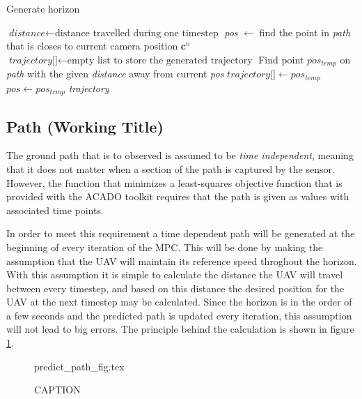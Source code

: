 \begin{algorithm}
\caption{Generate horizon}
\label{alg:genHor}
\begin{algorithmic}
	\State $\textit{distance} \gets \text{distance travelled during one timestep}$
	\State \textit{pos} $\gets$ find the point in \textit{path} that is closes to current camera position $\mathbf{c}^n$
	\State $\textit{trajectory[]} \gets \text{empty list to store the generated trajectory}$
		\State Find point \textit{$pos_{temp}$} on \textit{path} with the given \textit{distance} away from current \textit{pos}
		\State $\textit{trajectory[]} \gets pos_{temp}$
		\State $pos \gets pos_{temp}$
	\EndFor
	\Return \textit{trajectory}
\EndProcedure
\end{algorithmic}
\end{algorithm}


\subsection{Path (Working Title)}

The ground path that is to observed is assumed to be \textit{time independent}, meaning that it does not matter when a section of the path is captured by the sensor. However, the function that minimizes a least-squares objective function that is provided with the ACADO toolkit requires that the path is given as values with associated time points.

In order to meet this requirement a time dependent path will be generated at the beginning of every iteration of the MPC. This will be done by making the assumption that the UAV will maintain its reference speed throghout the horizon. With this assumption it is simple to calculate the distance the UAV will travel between every timestep, and based on this distance the desired position for the UAV at the next timestep may be calculated. Since the horizon is in the order of a few seconds and the predicted path is updated every iteration, this assumption will not lead to big errors. The principle behind the calculation is shown in figure \ref{fig:predict_path}.

\begin{figure}
	{predict_path_fig.tex}
	\caption{CAPTION}
	\label{fig:predict_path}
\end{figure}